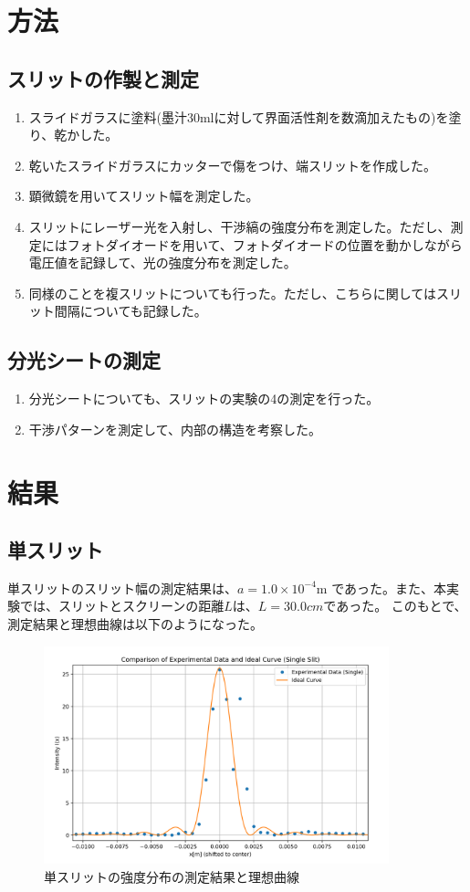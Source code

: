 \documentclass[a4paper,11pt]{jsarticle}
\begin{document}
\section{方法}
\subsection{スリットの作製と測定}
\begin{enumerate}
    \item スライドガラスに塗料(墨汁30mlに対して界面活性剤を数滴加えたもの)を塗り、乾かした。
    \item 乾いたスライドガラスにカッターで傷をつけ、端スリットを作成した。
    \item 顕微鏡を用いてスリット幅を測定した。
    \item スリットにレーザー光を入射し、干渉縞の強度分布を測定した。ただし、測定にはフォトダイオードを用いて、フォトダイオードの位置を動かしながら電圧値を記録して、光の強度分布を測定した。
    \item 同様のことを複スリットについても行った。ただし、こちらに関してはスリット間隔についても記録した。
\end{enumerate}

\subsection{分光シートの測定}
\begin{enumerate}
  \item 分光シートについても、スリットの実験の4の測定を行った。
  \item 干渉パターンを測定して、内部の構造を考察した。
\end{enumerate}

\section{結果}
\subsection{単スリット}
単スリットのスリット幅の測定結果は、$a = 1.0 \times 10^{-4}\si{\meter}$
であった。また、本実験では、スリットとスクリーンの距離$L$は、$L=30.0 \si{cm}$であった。
このもとで、測定結果と理想曲線は以下のようになった。
\begin{figure}[H]
    \begin{center}
    \includegraphics[width=100mm]{tan.png}
    \end{center}
    \caption{単スリットの強度分布の測定結果と理想曲線}
    \label{fig:tan}
\end{figure}
\end{document}
